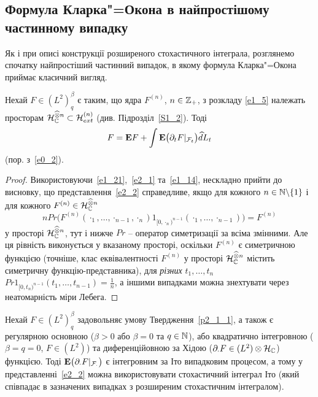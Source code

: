 \subsection{Формула Кларка"=Окона в найпростішому частинному випадку}\label{S2_1}
Як і при описі конструкції розширеного стохастичного інтеграла, розглянемо спочатку найпростіший
частинний випадок, в якому формула Кларка"=Окона приймає класичний вигляд.
\begin{subproposition}\label{p2_1_1}
Нехай $F\in (L^2)^\beta_q$ є таким, що ядра $F^{(n)}$, $n\in\mathbb{Z}_+$, з розкладу
\eqref{e1_5} належать просторам
$\mathcal{H}_{\mathbb{C}}^{\widehat\otimes n}\subset\mathcal{H}_{ext}^{(n)}$
(див. Підрозділ~\ref{S1_2}). Тоді
\begin{equation}\label{e2_2}
F=\mathbf{E}{F}+\int\mathbf{E}\big(\partial_t F|_{\mathcal F_t}\big)\widehat dL_t
\end{equation}
(пор. з~\eqref{e0_2}).
\end{subproposition}
\begin{proof}
Використовуючи~\eqref{e1_21},~\eqref{e2_1} та~\eqref{e1_14}, нескладно прийти до висновку,
що представлення~\eqref{e2_2} справедливе, якщо для кожного
$n\in\mathbb{N}\backslash\{1\}$ і для кожного
$F^{(n)}\in\mathcal{H}_{\mathbb{C}}^{\widehat\otimes n}$
\begin{equation*}
nPr\big(F^{(n)}(\cdot_1,\dots,\cdot_{n-1},\cdot_n)
1_{[0,\cdot_n)^{n-1}}(\cdot_1,\dots,\cdot_{n-1})\big)=F^{(n)}
\end{equation*}
у просторі $\mathcal{H}_{\mathbb{C}}^{\widehat\otimes n}$, тут і нижче $Pr$ -- оператор
симетризації за всіма змінними. Але ця рівність виконується у вказаному просторі, оскільки
$F^{(n)}$ є симетричною функцією (точніше, клас еквівалентності $F^{(n)}$ у просторі
$\mathcal{H}_{\mathbb{C}}^{\widehat\otimes n}$ містить симетричну функцію-представника),
для {\it різних} $t_1,\dots,t_n$ $Pr1_{[0,t_n)^{n-1}}(t_1,\dots,t_{n-1})=\frac{1}{n}$, а
іншими випадками можна знехтувати через неатомарність міри Лебега.
\end{proof}

\begin{subremark}
Нехай $F\in (L^2)^\beta_q$ задовольняє умову Твердження~\ref{p2_1_1}, а також є регулярною
основною ($\beta>0$ або $\beta=0$ та $q\in\mathbb{N}$), або квадратично інтегровною
($\beta=q=0$, $F\in (L^2)$) та диференційовною за Хідою
($\partial_\cdot F\in (L^2)\otimes\mathcal{H}_{\mathbb{C}}$) функцією. Тоді
$\mathbf{E}\big(\partial_\cdot F|_{\mathcal F_\cdot}\big)$ є інтегровним за Іто випадковим
процесом, а тому у представленні~\eqref{e2_2} можна використовувати стохастичний інтеграл Іто
(який співпадає в зазначених випадках з розширеним стохастичним інтегралом).
\end{subremark}

